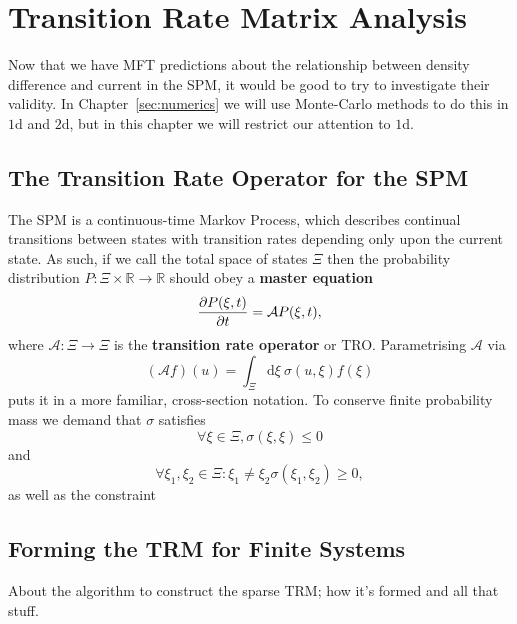 \chapter{Transition Rate Matrix Analysis} 
\label{sec:transRateChapter}
Now that we have MFT predictions about the relationship between density difference and
current in the SPM, it would be good to try to investigate their validity. In Chapter~\ref{sec:numerics} we will use Monte-Carlo methods to do this in $1$d and $2$d, but in this chapter we will restrict our attention to $1$d.

\section{The Transition Rate Operator for the SPM}
The SPM is a continuous-time Markov Process, which describes continual transitions between states
with transition rates depending only upon the current state. As such, if we call the total space of
states $\Xi$ then the probability distribution $P: \Xi \times \mathbb{R} \rightarrow  \mathbb{R}$ should obey a \textbf{master equation}
\begin{equation}
 \frac{\partial P(\xi, t)}{\partial t} = \mathcal{A} P(\xi, t),
\end{equation}
where $\mathcal{A}:\Xi \rightarrow \Xi$ is the \textbf{transition rate operator}
or TRO. Parametrising $\mathcal{A}$ via 
\begin{equation}
 (\mathcal{A}f)(u) = \int_\Xi \! \! \mathrm{d}  \xi \ \sigma (u, \xi) f(\xi)
\end{equation}
puts it in a more familiar, cross-section notation. To conserve finite probability mass
we demand that $\sigma$ satisfies
\begin{equation}
 \forall \xi \in \Xi, \sigma (\xi , \xi) \le 0 
\end{equation}
and
\begin{equation}
 \forall \xi_1 , \xi_2 \in \Xi : \xi_1 \ne \xi_2 \sigma (\xi_1 , \xi_2) \ge 0 ,
\end{equation}
as well as the constraint
\begin{equation}
 
\end{equation}


\section{Forming the TRM for Finite Systems}
About the algorithm to construct the sparse TRM; how it's formed and all that stuff.

